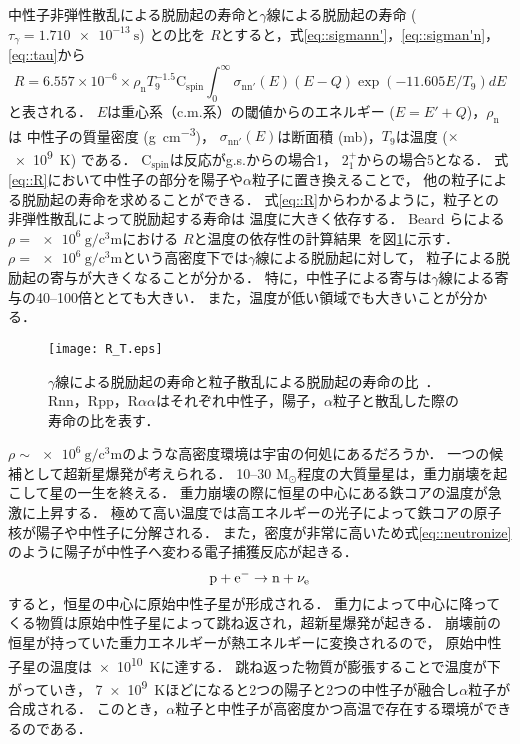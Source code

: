 \documentclass[../master]{subfiles}
\begin{document}
中性子非弾性散乱による脱励起の寿命と$\gamma$線による脱励起の寿命 ($\tau_{\gamma} = \SI{1.710e-13}{\second}$) との比を
$R$とすると，式\eqref{eq::sigmann'}，\eqref{eq::sigman'n}，\eqref{eq::tau}から
\begin{equation}
  R = 6.557\times10^{-6}\times\rho_{\mathrm{n}}T_{9}^{-1.5}\mathrm{C}_{{\text{spin}}}
  \int^{\infty}_{0}\sigma_{\mathrm{nn}'}(E)(E-Q)\exp(-11.605E/T_{9})dE
  \label{eq::R}
\end{equation}
と表される．
$E$は重心系（c.m.系）の閾値からのエネルギー ($E=E'+Q$)，$\rho_{\mathrm{n}}$は
中性子の質量密度 (\si{\gram\per\cubic\centi\metre})，
$\sigma_{\mathrm{nn}'}(E)$は断面積 (\si{\milli\barn})，$T_{9}$は温度 ($\times$\SI{e9}{\kelvin}) である．
$\mathrm{C}_{{\text{spin}}}$は反応がg.s.からの場合1，
$2_{1}^{+}$からの場合5となる．
式\eqref{eq::R}において中性子の部分を陽子や$\alpha$粒子に置き換えることで，
他の粒子による脱励起の寿命を求めることができる．
式\eqref{eq::R}からわかるように，粒子との非弾性散乱によって脱励起する寿命は
温度に大きく依存する．
Beard らによる$\rho = \SI{e6}{\gram\per\cubic\centi\metre}$における
$R$と温度の依存性の計算結果~\cite{hotdensemedium}を図\ref{fig::R}に示す．
$\rho = \SI{e6}{\gram\per\cubic\centi\metre}$という高密度下では$\gamma$線による脱励起に対して，
粒子による脱励起の寄与が大きくなることが分かる．
特に，中性子による寄与は$\gamma$線による寄与の40--100倍ととても大きい．
また，温度が低い領域でも大きいことが分かる．
\begin{figure}
  \centering
  \texttt{[image: R\_T.eps]}
  \caption[$\gamma$線による脱励起の寿命と粒子散乱による脱励起の寿命の比．]
          {$\gamma$線による脱励起の寿命と粒子散乱による脱励起の寿命の比~\cite{hotdensemedium}．
    Rnn，Rpp，R$\alpha\alpha$はそれぞれ中性子，陽子，$\alpha$粒子と散乱した際の寿命の比を表す．}
  \label{fig::R}
\end{figure}

$\rho\sim\SI{e6}{\gram\per\cubic\centi\metre}$のような高密度環境は宇宙の何処にあるだろうか．
一つの候補として超新星爆発が考えられる．
10--30 $\mathrm{M_{\odot}}$程度の大質量星は，重力崩壊を起こして星の一生を終える．
重力崩壊の際に恒星の中心にある鉄コアの温度が急激に上昇する．
極めて高い温度では高エネルギーの光子によって鉄コアの原子核が陽子や中性子に分解される．
また，密度が非常に高いため式\eqref{eq::neutronize}のように陽子が中性子へ変わる電子捕獲反応が起きる．
\begin{equation}
  {\rm p}+{\rm e}^{-} \rightarrow {\rm n}+\nu_{\rm e}
  \label{eq::neutronize}
\end{equation}
すると，恒星の中心に原始中性子星が形成される．
重力によって中心に降ってくる物質は原始中性子星によって跳ね返され，超新星爆発が起きる．
崩壊前の恒星が持っていた重力エネルギーが熱エネルギーに変換されるので，
原始中性子星の温度は\SI{e10}{\kelvin}に達する．
跳ね返った物質が膨張することで温度が下がっていき，
\SI{7e9}{\kelvin}ほどになると2つの陽子と2つの中性子が融合し$\alpha$粒子が合成される．
このとき，$\alpha$粒子と中性子が高密度かつ高温で存在する環境ができるのである．
\end{document}
